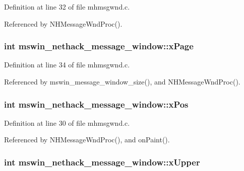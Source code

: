 Definition at line 32 of file mhmsgwnd.\+c.



Referenced by N\+H\+Message\+Wnd\+Proc().

\hypertarget{structmswin__nethack__message__window_ad9bd73638158de8be8fae776b862e639}{
\subsubsection[{x\+Page}]{\setlength{\rightskip}{0pt plus 5cm}int mswin\+\_\+nethack\+\_\+message\+\_\+window\+::x\+Page}}\label{structmswin__nethack__message__window_ad9bd73638158de8be8fae776b862e639}


Definition at line 34 of file mhmsgwnd.\+c.



Referenced by mswin\+\_\+message\+\_\+window\+\_\+size(), and N\+H\+Message\+Wnd\+Proc().

\hypertarget{structmswin__nethack__message__window_a2d63ab3f820de7f35b50f99c982dbf55}{
\subsubsection[{x\+Pos}]{\setlength{\rightskip}{0pt plus 5cm}int mswin\+\_\+nethack\+\_\+message\+\_\+window\+::x\+Pos}}\label{structmswin__nethack__message__window_a2d63ab3f820de7f35b50f99c982dbf55}


Definition at line 30 of file mhmsgwnd.\+c.



Referenced by N\+H\+Message\+Wnd\+Proc(), and on\+Paint().

\hypertarget{structmswin__nethack__message__window_a78d9744ac68cb597f4917b871ba9f134}{
\subsubsection[{x\+Upper}]{\setlength{\rightskip}{0pt plus 5cm}int mswin\+\_\+nethack\+\_\+message\+\_\+window\+::x\+Upper}}\label{structmswin__nethack__message__window_a78d9744ac68cb597f4917b871ba9f134}


